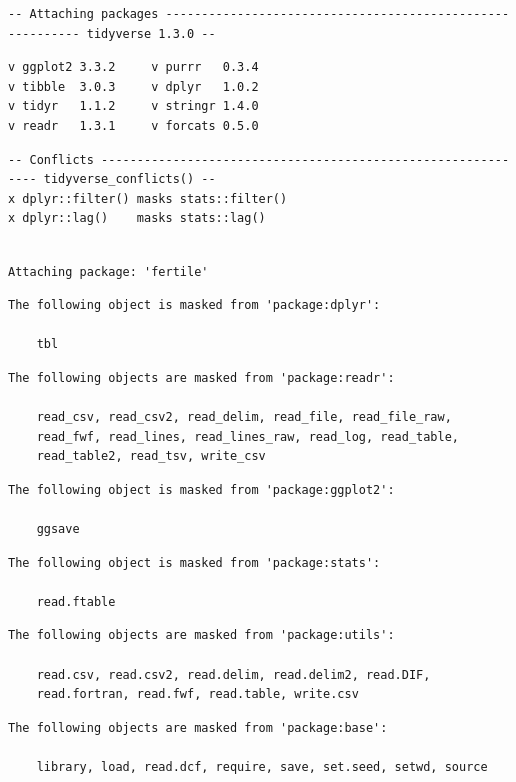 \documentclass[12pt,twoside]{reedthesis}
\newenvironment{Shaded}{\begin{snugshade}}{\end{snugshade}}
\newcommand{\KeywordTok}[1]{\textcolor[rgb]{0.13,0.29,0.53}{\textbf{#1}}}
\newcommand{\DecValTok}[1]{\textcolor[rgb]{0.00,0.00,0.81}{#1}}
\newcommand{\StringTok}[1]{\textcolor[rgb]{0.31,0.60,0.02}{#1}}
\newcommand{\OperatorTok}[1]{\textcolor[rgb]{0.81,0.36,0.00}{\textbf{#1}}}
\newcommand{\NormalTok}[1]{#1}
\begin{document}
\footnotesize
\begin{verbatim}
-- Attaching packages ---------------------------------------------------------- tidyverse 1.3.0 --
\end{verbatim}
\begin{verbatim}
v ggplot2 3.3.2     v purrr   0.3.4
v tibble  3.0.3     v dplyr   1.0.2
v tidyr   1.1.2     v stringr 1.4.0
v readr   1.3.1     v forcats 0.5.0
\end{verbatim}
\begin{verbatim}
-- Conflicts ------------------------------------------------------------- tidyverse_conflicts() --
x dplyr::filter() masks stats::filter()
x dplyr::lag()    masks stats::lag()
\end{verbatim}
\begin{verbatim}

Attaching package: 'fertile'
\end{verbatim}
\begin{verbatim}
The following object is masked from 'package:dplyr':

    tbl
\end{verbatim}
\begin{verbatim}
The following objects are masked from 'package:readr':

    read_csv, read_csv2, read_delim, read_file, read_file_raw,
    read_fwf, read_lines, read_lines_raw, read_log, read_table,
    read_table2, read_tsv, write_csv
\end{verbatim}
\begin{verbatim}
The following object is masked from 'package:ggplot2':

    ggsave
\end{verbatim}
\begin{verbatim}
The following object is masked from 'package:stats':

    read.ftable
\end{verbatim}
\begin{verbatim}
The following objects are masked from 'package:utils':

    read.csv, read.csv2, read.delim, read.delim2, read.DIF,
    read.fortran, read.fwf, read.table, write.csv
\end{verbatim}
\begin{verbatim}
The following objects are masked from 'package:base':

    library, load, read.dcf, require, save, set.seed, setwd, source
\end{verbatim}
\begin{Shaded}
\end{Shaded}
\end{document}
